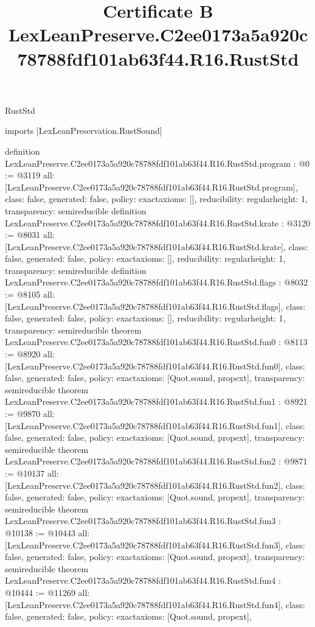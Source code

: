 \begin{lexlean}{RustStd}
\title{Certificate B LexLeanPreserve.C2ee0173a5a920c78788fdf101ab63f44.R16.RustStd}
\begin{coremodule}
imports [LexLeanPreservation.RustSound]

definition LexLeanPreserve.C2ee0173a5a920c78788fdf101ab63f44.R16.RustStd.program : @0 := @3119 {
  all: [LexLeanPreserve.C2ee0173a5a920c78788fdf101ab63f44.R16.RustStd.program],
  class: false,
  generated: false,
  policy: exact{axioms: []},
  reducibility: regular{height: 1},
  transparency: semireducible
}
definition LexLeanPreserve.C2ee0173a5a920c78788fdf101ab63f44.R16.RustStd.krate : @3120 := @8031 {
  all: [LexLeanPreserve.C2ee0173a5a920c78788fdf101ab63f44.R16.RustStd.krate],
  class: false,
  generated: false,
  policy: exact{axioms: []},
  reducibility: regular{height: 1},
  transparency: semireducible
}
definition LexLeanPreserve.C2ee0173a5a920c78788fdf101ab63f44.R16.RustStd.flags : @8032 := @8105 {
  all: [LexLeanPreserve.C2ee0173a5a920c78788fdf101ab63f44.R16.RustStd.flags],
  class: false,
  generated: false,
  policy: exact{axioms: []},
  reducibility: regular{height: 1},
  transparency: semireducible
}
theorem LexLeanPreserve.C2ee0173a5a920c78788fdf101ab63f44.R16.RustStd.fun0 : @8113 := @8920 {
  all: [LexLeanPreserve.C2ee0173a5a920c78788fdf101ab63f44.R16.RustStd.fun0],
  class: false,
  generated: false,
  policy: exact{axioms: [Quot.sound, propext]},
  transparency: semireducible
}
theorem LexLeanPreserve.C2ee0173a5a920c78788fdf101ab63f44.R16.RustStd.fun1 : @8921 := @9870 {
  all: [LexLeanPreserve.C2ee0173a5a920c78788fdf101ab63f44.R16.RustStd.fun1],
  class: false,
  generated: false,
  policy: exact{axioms: [Quot.sound, propext]},
  transparency: semireducible
}
theorem LexLeanPreserve.C2ee0173a5a920c78788fdf101ab63f44.R16.RustStd.fun2 : @9871 := @10137 {
  all: [LexLeanPreserve.C2ee0173a5a920c78788fdf101ab63f44.R16.RustStd.fun2],
  class: false,
  generated: false,
  policy: exact{axioms: [Quot.sound, propext]},
  transparency: semireducible
}
theorem LexLeanPreserve.C2ee0173a5a920c78788fdf101ab63f44.R16.RustStd.fun3 : @10138 := @10443 {
  all: [LexLeanPreserve.C2ee0173a5a920c78788fdf101ab63f44.R16.RustStd.fun3],
  class: false,
  generated: false,
  policy: exact{axioms: [Quot.sound, propext]},
  transparency: semireducible
}
theorem LexLeanPreserve.C2ee0173a5a920c78788fdf101ab63f44.R16.RustStd.fun4 : @10444 := @11269 {
  all: [LexLeanPreserve.C2ee0173a5a920c78788fdf101ab63f44.R16.RustStd.fun4],
  class: false,
  generated: false,
  policy: exact{axioms: [Quot.sound, propext]},
}
\end{coremodule}
\end{lexlean}
